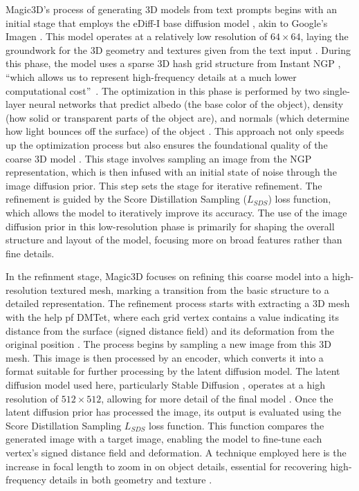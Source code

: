 Magic3D's process of generating 3D models from text prompts begins with an initial stage that employs the eDiff-I base diffusion model \citep{balaji2022eDiff-I}, akin to Google's Imagen \citep{saharia2022imagen}. This model operates at a relatively low resolution of \(64 \times 64\), laying the groundwork for the 3D geometry and textures given from the text input \citep{lin2023magic3d}. During this phase, the model uses a sparse 3D hash grid structure from Instant NGP \citep{M_ller_2022}, ``which allows us to represent high-frequency details at a much lower computational cost''~\citep{lin2023magic3d}. The optimization in this phase is performed by two single-layer neural networks that predict albedo (the base color of the object), density (how solid or transparent parts of the object are), and normals (which determine how light bounces off the surface) of the object \citep{lin2023magic3d}. This approach not only speeds up the optimization process but also ensures the foundational quality of the coarse 3D model \citep{lin2023magic3d}. 
This stage involves sampling an image from the NGP representation, which is then infused with an initial state of noise through the image diffusion prior. This step sets the stage for iterative refinement. The refinement is guided by the Score Distillation Sampling (\(L_{SDS}\)) loss function, which allows the model to iteratively improve its accuracy. The use of the image diffusion prior in this low-resolution phase is primarily for shaping the overall structure and layout of the model, focusing more on broad features rather than fine details.

In the refinment stage, Magic3D focuses on refining this coarse model into a high-resolution textured mesh, marking a transition from the basic structure to a detailed representation. The refinement process starts with extracting a 3D mesh with the help pf DMTet, where each grid vertex contains a value indicating its distance from the surface (signed distance field) and its deformation from the original position \citep{shen2021DMTet, lin2023magic3d}. The process begins by sampling a new image from this 3D mesh. This image is then processed by an encoder, which converts it into a format suitable for further processing by the latent diffusion model. The latent diffusion model used here, particularly Stable Diffusion \citep{rombachStableDiffusion}, operates at a high resolution of \(512 \times 512\), allowing for more detail of the final model \citep{lin2023magic3d}. Once the latent diffusion prior has processed the image, its output is evaluated using the Score Distillation Sampling \(L_{SDS}\) loss function. This function compares the generated image with a target image, enabling the model to fine-tune each vertex's signed distance field and deformation. A technique employed here is the increase in focal length to zoom in on object details, essential for recovering high-frequency details in both geometry and texture \citep{lin2023magic3d}.

